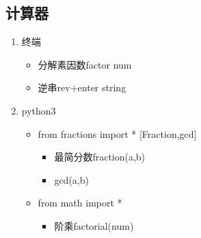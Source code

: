 \subsection{计算器}
  \begin{enumerate}
    \item 终端
      \begin{itemize}
        \item 分解素因数factor num
        \item 逆串rev+enter string
      \end{itemize}
    \item python3
      \begin{itemize}
        \item from fractions import * [Fraction,gcd]
          \begin{itemize}
            \item 最简分数fraction(a,b)
            \item gcd(a,b)
          \end{itemize}
        \item from math import *
          \begin{itemize}
            \item 阶乘factorial(num)
          \end{itemize}
      \end{itemize}
  \end{enumerate}

